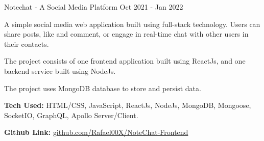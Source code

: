 \begin{cventries}
  \cventry
    {} %
    {Notechat - A Social Media Platform} %
    {Oct 2021 - Jan 2022} %
    {} %
    {
      \begin{cvitems} %
        \item {A simple social media web application built using full-stack technology. Users can share posts, like and comment, or engage in real-time chat with other users in their contacts.}
        \item {The project consists of one frontend application built using ReactJs, and one backend service built using NodeJs.}
        \item {The project uses MongoDB database to store and persist data.}
        \item {\textbf{Tech Used:} HTML/CSS, JavaScript, ReactJs, NodeJs, MongoDB, Mongoose, SocketIO, GraphQL, Apollo Server/Client.}
        \item {\textbf{Github Link:} \href{https://github.com/Rafael00X/NoteChat-Frontend}{github.com/Rafael00X/NoteChat-Frontend}}
      \end{cvitems}
    }

\end{cventries}
